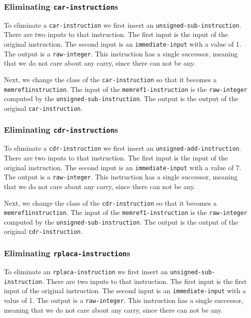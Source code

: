 \subsubsection{Eliminating \texttt{car-instruction}s}

To eliminate a \texttt{car-instruction} we first insert an
\texttt{unsigned-sub-instruction}.  There are two inputs to that
instruction.  The first input is the input of the original
instruction.  The second input is an \texttt{immediate-input} with a
value of 1.  The output is a \texttt{raw-integer}.  This instruction
has a single successor, meaning that we do not care about any carry,
since there can not be any.

Next, we change the class of the \texttt{car-instruction} so that it
becomes a \texttt{memref1\-instruction}.  The input of the
\texttt{memref1-instruction} is the \texttt{raw-integer} computed by
the \texttt{unsigned-sub-instruction}.  The output is the output of
the original \texttt{car-instruction}.

\subsubsection{Eliminating \texttt{cdr-instruction}s}

To eliminate a \texttt{cdr-instruction} we first insert an
\texttt{unsigned-add-instruction}.  There are two inputs to that
instruction.  The first input is the input of the original
instruction.  The second input is an \texttt{immediate-input} with a
value of 7.  The output is a \texttt{raw-integer}.  This instruction
has a single successor, meaning that we do not care about any carry,
since there can not be any.

Next, we change the class of the \texttt{cdr-instruction} so that it
becomes a \texttt{memref1\-instruction}.  The input of the
\texttt{memref1-instruction} is the \texttt{raw-integer} computed by
the \texttt{unsigned-sub-instruction}.  The output is the output of
the original \texttt{cdr-instruction}.

\subsubsection{Eliminating \texttt{rplaca-instruction}s}

To eliminate an \texttt{rplaca-instruction} we first insert an
\texttt{unsigned-sub-instruction}.  There are two inputs to that
instruction.  The first input is the first input of the original
instruction.  The second input is an \texttt{immediate-input} with a
value of 1.  The output is a \texttt{raw-integer}.  This instruction
has a single successor, meaning that we do not care about any carry,
since there can not be any.

